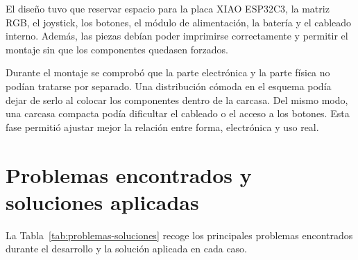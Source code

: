 El diseño tuvo que reservar espacio para la placa XIAO ESP32C3, la matriz RGB, el joystick, los botones, el módulo de alimentación, la batería y el cableado interno. Además, las piezas debían poder imprimirse correctamente y permitir el montaje sin que los componentes quedasen forzados.

Durante el montaje se comprobó que la parte electrónica y la parte física no podían tratarse por separado. Una distribución cómoda en el esquema podía dejar de serlo al colocar los componentes dentro de la carcasa. Del mismo modo, una carcasa compacta podía dificultar el cableado o el acceso a los botones. Esta fase permitió ajustar mejor la relación entre forma, electrónica y uso real.

\section{Problemas encontrados y soluciones aplicadas}
\label{sec:problemas-soluciones}

La Tabla~\ref{tab:problemas-soluciones} recoge los principales problemas encontrados durante el desarrollo y la solución aplicada en cada caso.


